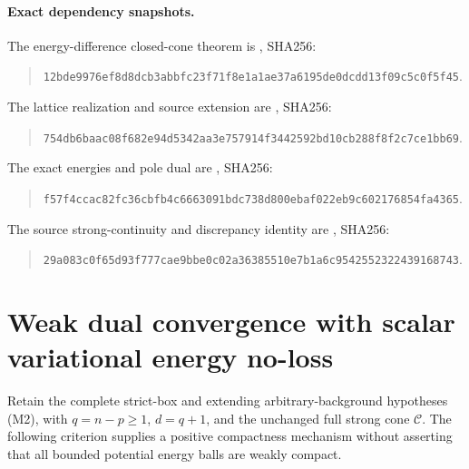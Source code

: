\documentclass[11pt,a4paper]{article}
\numberwithin{equation}{section}
\theoremstyle{definition}
\theoremstyle{remark}
\begin{document}
\paragraph{Exact dependency snapshots.}
The energy-difference closed-cone theorem is
, SHA256:
\begin{quote}\small
\nolinkurl{12bde9976ef8d8dcb3abbfc23f71f8e1a1ae37a6195de0dcdd13f09c5c0f5f45}.
\end{quote}
The lattice realization and source extension are
, SHA256:
\begin{quote}\small
\nolinkurl{754db6baac08f682e94d5342aa3e757914f3442592bd10cb288f8f2c7ce1bb69}.
\end{quote}
The exact energies and pole dual are
, SHA256:
\begin{quote}\small
\nolinkurl{f57f4ccac82fc36cbfb4c6663091bdc738d800ebaf022eb9c602176854fa4365}.
\end{quote}
The source strong-continuity and discrepancy identity are
, SHA256:
\begin{quote}\small
\nolinkurl{29a083c0f65d93f777cae9bbe0c02a36385510e7b1a6c9542552322439168743}.
\end{quote}



\section{Weak dual convergence with scalar variational energy no-loss}
\label{sec:r12-weak-dual-variational-energy-stability}

Retain the complete strict-box and extending arbitrary-background
hypotheses (M2), with $q=n-p\geq1$, $d=q+1$, and the unchanged
full strong cone $\mathscr C$. The following criterion supplies
a positive compactness mechanism without asserting that all
bounded potential energy balls are weakly compact.
\end{document}
